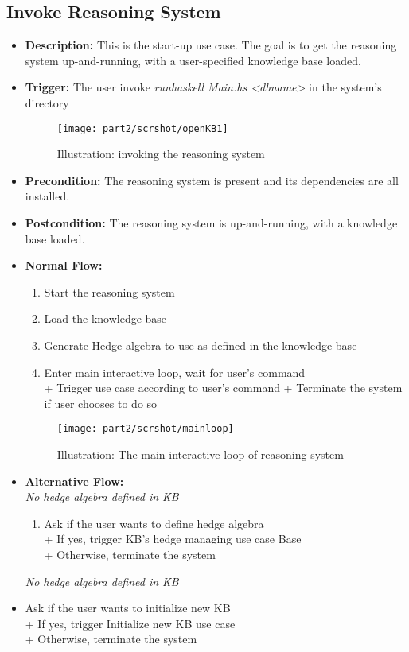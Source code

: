 \documentclass[../gr-final.tex]{subfiles}
\begin{document}
\subsection{Invoke Reasoning System}
\begin{itemize}
  \item {\bfseries Description:} This is the start-up use case.
    The goal is to get the reasoning system up-and-running, with a
    user-specified knowledge base loaded.   
  \item {\bfseries Trigger:} The user invoke {\em runhaskell
    Main.hs <dbname>} in the system's directory

\begin{figure}[H]
  \centering
  \texttt{[image: part2/scrshot/openKB1]}
  \caption{Illustration: invoking the reasoning system}
\end{figure}

  \item {\bfseries Precondition:} The reasoning system is present and its
    dependencies are all installed.    
  \item {\bfseries Postcondition:} The reasoning system is
    up-and-running, with a knowledge base loaded.
  \item {\bfseries Normal Flow:}
    \begin{enumerate}
      \item Start the reasoning system
      \item Load the knowledge base
      \item Generate Hedge algebra to use as defined in the
        knowledge base
      \item Enter main interactive loop, wait for user's
        command\\
        \indent + Trigger use case according to user's command
        \indent + Terminate the system if user chooses to do so
    \end{enumerate}
\begin{figure}[H]
  \centering
  \texttt{[image: part2/scrshot/mainloop]}
  \caption{Illustration: The main interactive loop of reasoning system}
\end{figure}
  \item {\bfseries Alternative Flow:}
    \\{\em No hedge algebra defined in KB}
    \begin{enumerate}
      \item Ask if the user wants to define hedge algebra\\
            \indent + If yes, trigger KB's hedge managing use
            case 
            Base\\
            \indent + Otherwise, terminate the system
    \end{enumerate}
    {\em No hedge algebra defined in KB}
      \item Ask if the user wants to initialize new KB\\
          \indent + If yes, trigger Initialize new KB use case\\
          \indent + Otherwise, terminate the system


\end{itemize}
\end{document}
